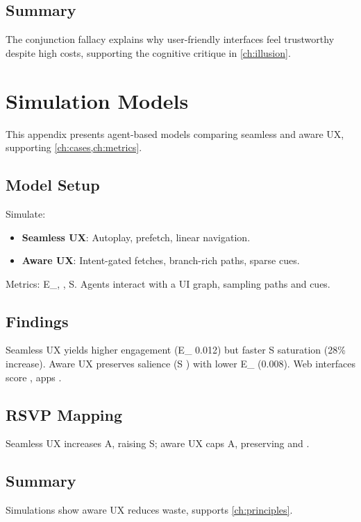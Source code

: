 \documentclass[openany]{book}
\newcommand{\PhiS}{\Phi} %
\newcommand{\Sent}{S} %
\newcommand{\Eint}{E_{\mathrm{int}}} %
\newcommand{\Auton}{\mathcal{A}} %
\newcommand{\kWh}{\mathrm{kWh}}
\begin{document}
\section{Summary}
The conjunction fallacy explains why user-friendly interfaces feel trustworthy despite high costs, supporting the cognitive critique in \cref{ch:illusion}.

\chapter{Simulation Models}
\label{app:simulation}

This appendix presents agent-based models comparing seamless and aware UX, supporting \cref{ch:cases,ch:metrics}.

\section{Model Setup}
\label{sec:sim-setup}
Simulate:
\begin{itemize}
  \item \textbf{Seamless UX}: Autoplay, prefetch, linear navigation.
  \item \textbf{Aware UX}: Intent-gated fetches, branch-rich paths, sparse cues.
\end{itemize}
Metrics: \Eint{}, \Auton{}, \Sent{}. Agents interact with a UI graph, sampling paths and cues.

\section{Findings}
\label{sec:sim-findings}
Seamless UX yields higher engagement (\Eint{} \approx \SI{0.012}{\kWh}) but faster \Sent{} saturation (28\% increase). Aware UX preserves salience (\Sent{} ) with lower \Eint{} (\SI{0.008}{\kWh}). Web interfaces score \Auton{} , apps  \citep{doctorow2022}.

\section{RSVP Mapping}
\label{sec:sim-rsvp}
Seamless UX increases A, raising S; aware UX caps A, preserving \PhiS{} and \Auton{}.

\section{Summary}
Simulations show aware UX reduces waste, supports \cref{ch:principles}.
\end{document}
